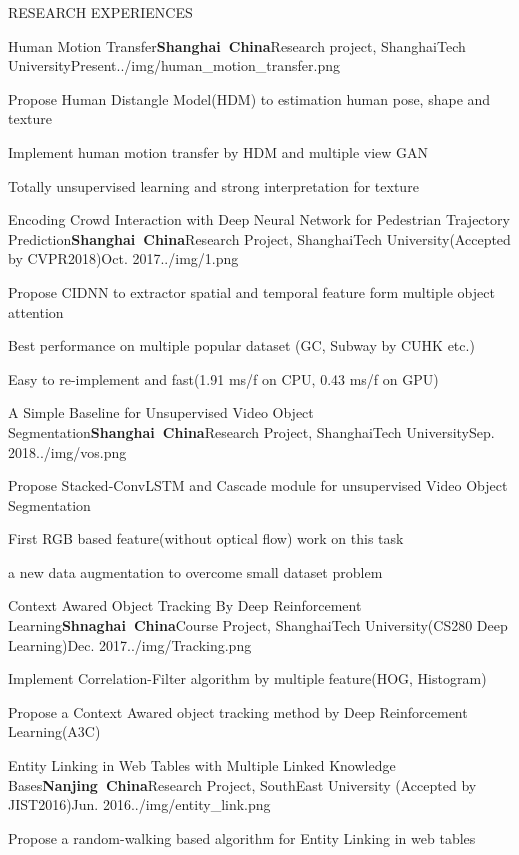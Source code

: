 \documentclass{resume} %
\begin{document}
\begin{rSection}{RESEARCH EXPERIENCES}

\begin{rSubsection}{Human Motion Transfer}{\bf Shanghai\ China}{Research project, ShanghaiTech University}{Present}{../img/human_motion_transfer.png}
    \item Propose Human Distangle Model(HDM) to estimation human pose, shape and texture
    \item Implement human motion transfer by HDM and multiple view GAN
    \item Totally unsupervised learning and strong interpretation for texture 
\end{rSubsection}

\begin{rSubsection}{Encoding Crowd Interaction with Deep Neural Network for Pedestrian Trajectory Prediction}{\bf Shanghai\ China}{Research Project, ShanghaiTech University(Accepted by CVPR2018)}{Oct. 2017}{../img/1.png}
    \item Propose CIDNN to extractor spatial and temporal feature form  multiple object attention
    \item Best performance on multiple popular dataset (GC, Subway by CUHK etc.)
    \item Easy to re-implement and fast(1.91 ms/f on CPU, 0.43 ms/f on GPU)
\end{rSubsection}

\begin{rSubsection}{A Simple Baseline for Unsupervised Video Object Segmentation}{\bf Shanghai\ China}{Research Project, ShanghaiTech University}{Sep. 2018}{../img/vos.png}
    \item Propose Stacked-ConvLSTM and Cascade module for unsupervised Video Object Segmentation
    \item First RGB based feature(without optical flow) work on this task
    \item a new data augmentation to overcome small dataset problem 
\end{rSubsection}

\begin{rSubsection}{Context Awared Object Tracking By Deep Reinforcement Learning}{\bf Shnaghai\ China}{Course Project, ShanghaiTech University(CS280 Deep Learning)}{Dec. 2017}{../img/Tracking.png}
    \item Implement Correlation-Filter algorithm by multiple feature(HOG, Histogram)
    \item Propose a Context Awared object tracking method by Deep Reinforcement Learning(A3C)
\end{rSubsection}

\begin{rSubsection}{Entity Linking in Web Tables with Multiple Linked Knowledge Bases}{\bf Nanjing\ China}{Research Project, SouthEast University (Accepted by JIST2016)}{Jun. 2016}{../img/entity_link.png}
    \item Propose a random-walking based algorithm for Entity Linking in web tables
\end{rSubsection}
            
\end{rSection} 
\end{document}
